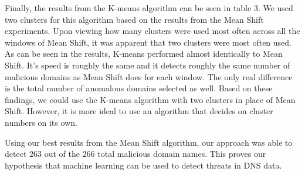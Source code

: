 Finally, the results from the K-means algorithm can be seen in table $3$.
We used two clusters for this algorithm based on the results from the Mean Shift experiments.
Upon viewing how many clusters were used most often across all the windows of Mean Shift, it was
apparent that two clusters were most often used.
As can be seen in the results, K-means performed almost identically to Mean Shift.
It's speed is roughly the same and it detects roughly the same number of malicious domains as Mean
Shift does for each window.
The only real difference is the total number of anomalous domains selected as well.
Based on these findings, we could use the K-means algorithm with two clusters in place of Mean Shift.
However, it is more ideal to use an algorithm that decides on cluster numbers on its own.

Using our best results from the Mean Shift algorithm, our approach was able to detect $263$ out of
the $266$ total malicious domain names.
This proves our hypothesis that machine learning can be used to detect threats in DNS data.
